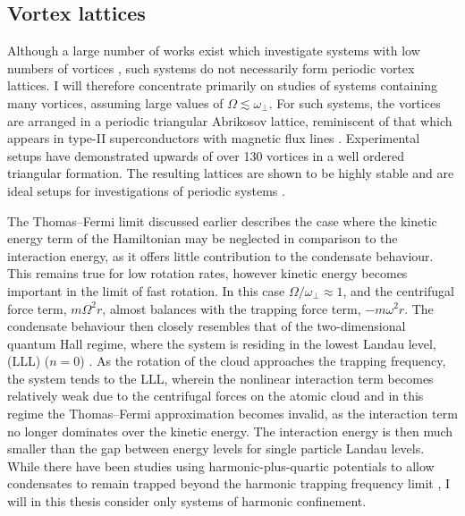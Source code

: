 \subsection{Vortex lattices}\label{sec:sec2_vtxlatt}

Although a large number of works exist which investigate systems with low numbers of vortices \cite{THS:Davies_2000,Vtx:Chevy_prl_2000,Vtx:Cooper_prl_2001,Vtx:Rosenbusch_prl_2002,Vtx:Ogawa_pra_2002,Vtx:Bretin_joptb_2003,Vtx:Madison_prl_2000,Vtx:Madison_jmo_2000,Vtx:Chevy_aoi_2001,Vtx:Madison_prl_2001,Vtx:Mottonen_jpcm_2002}, such systems do not necessarily form periodic vortex lattices. I will therefore concentrate primarily on studies of systems containing many vortices, assuming large values of $\Omega \lesssim \omega_\perp$. For such systems, the vortices are arranged in a periodic triangular Abrikosov lattice, reminiscent of that which appears in type-II superconductors with magnetic flux lines \cite{Vtx:AboShaeer_sci_2001}. Experimental setups have demonstrated upwards of over 130 vortices in a well ordered triangular formation. The resulting lattices are shown to be highly stable and are ideal setups for investigations of periodic systems \cite{Vtx:AboShaeer_sci_2001,Vtx:Engels_prl_2002}.

The Thomas--Fermi limit discussed earlier describes the case where the kinetic energy term of the Hamiltonian may be neglected in comparison to the interaction energy, as it offers little contribution to the condensate behaviour. This remains true for low rotation rates, however kinetic energy becomes important in the limit of fast rotation. In this case $\Omega/\omega_{\perp}\approx 1$, and the centrifugal force term, $m\Omega^2r$, almost balances with the trapping force term, $-m\omega^2r$. The condensate behaviour then closely resembles that of the two-dimensional quantum Hall regime, where the system is residing in the lowest Landau level, (LLL) ($n=0$) \cite{Vtx:Ho_prl_2001}.  As the rotation of the cloud approaches the trapping frequency, the system tends to the LLL, wherein the nonlinear interaction term becomes relatively weak due to the centrifugal forces on the atomic cloud and in this regime the Thomas--Fermi approximation becomes invalid, as the interaction term no longer dominates over the kinetic energy. The interaction energy is then much smaller than the gap between energy levels for single particle Landau levels. While there have been studies using harmonic-plus-quartic potentials to allow condensates to remain trapped beyond the harmonic trapping frequency limit \cite{BEC:Bretin_prl_2004,Vtx:Ghosh_pra_2004}, I will in this thesis consider only systems of harmonic confinement.

